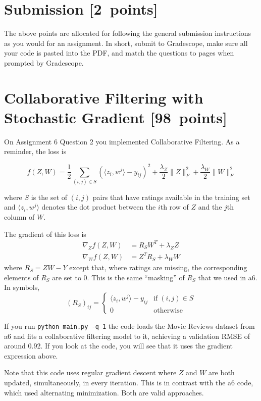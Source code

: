 \documentclass{article}
\newcommand\pts[1]{\textcolor{pointscolour}{[#1~points]}}
\begin{document}
\section*{Submission \pts{2}}
The above points are allocated for following the general submission instructions as you would for an assignment. In short, submit to Gradescope, make sure all your code is pasted into the PDF, and match the questions to pages when prompted by Gradescope.

\clearpage
\section{Collaborative Filtering with Stochastic Gradient \pts{98}}

On Assignment 6 Question 2 you implemented Collaborative Filtering. As a reminder, the loss is

\[
f(Z,W)= \frac12 \sum_{(i,j)\in S} \left( \langle z_i, w^j \rangle - y_{ij}\right) ^2 + \frac{\lambda_Z}{2}\| Z\| ^2_F + \frac{\lambda_W}{2}\| W\| ^2_F
\]

where $S$ is the set of $(i,j)$ pairs that have ratings available in the training set and $\langle z_i, w^j \rangle$ denotes the dot product between the $i$th row of $Z$ and the $j$th column of $W$.

The gradient of this loss is
\begin{align*}
\nabla_Z f(Z,W) &= R_S W^T + \lambda_Z Z\\
\nabla_W f(Z,W) &= Z^TR_S + \lambda_W W
\end{align*}
where $R_S= ZW-Y$ except that, where ratings are missing, the corresponding elements of $R_S$ are set to 0. This is the same ``masking'' of $R_S$ that we used in a6. In symbols,
\[
(R_S)_{ij} = \begin{cases}
\langle z_i, w^j \rangle - y_{ij} & \textrm{if}\; (i,j) \in S \\
0 & \textrm{otherwise}
\end{cases}
\]

If you run \verb|python main.py -q 1| the code loads the Movie Reviews dataset from a6 and fits a collaborative filtering model to it, achieving a validation RMSE of around 0.92. If you look at the code, you will see that it uses the gradient expression above.

Note that this code uses regular gradient descent where $Z$ and $W$ are both updated, simultaneously, in every iteration. This is in contrast with the a6 code, which used alternating minimization. Both are valid approaches.
\end{document}
